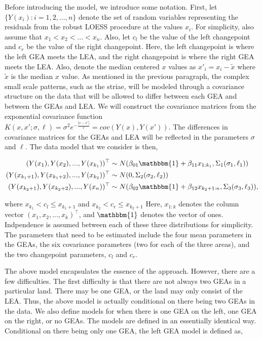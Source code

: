 \documentclass[12pt]{article}
\begin{document}
Before introducing the model, we introduce some notation. First, let
\(\{Y(x_i): i = 1,2, ..., n\}\) denote the set of random variables
representing the residuals from the robust LOESS procedure at the values
\(x_i\). For simplicity, also assume that \(x_1 < x_2 < ... < x_n\).
Also, let \(c_l\) be the value of the left changepoint and \(c_r\) be
the value of the right changepoint. Here, the left changepoint is where
the left GEA meets the LEA, and the right changepoint is where the right
GEA meets the LEA. Also, denote the median centered \(x\) values as
\(x'_i = x_i - \tilde{x}\) where \(\tilde{x}\) is the median \(x\)
value. As mentioned in the previous paragraph, the complex small scale
patterns, such as the striae, will be modeled through a covariance
structure on the data that will be allowed to differ between each GEA
and between the GEAs and LEA. We will construct the covariance matrices
from the exponential covariance function
\(K(x, x';\sigma, \ell) = \sigma^2 e^{-\frac{|x - x'|}{\ell}} = cov(Y(x), Y(x'))\).
The differences in covariance matrices for the GEAs and LEA will be
reflected in the parameters \(\sigma\) and \(\ell\). The data model that
we consider is then,

\begin{align}
(Y(x_1), Y(x_2), ..., Y(x_{k_1}))^{\top} &\sim N(\beta_{01}\mathbbm{1} + \beta_{11} x_{1:k_1}, \Sigma_1(\sigma_1, \ell_1)) \\
(Y(x_{k_1 + 1}), Y(x_{k_1 + 2}), ..., Y(x_{k_2}))^{\top} &\sim N(0, \Sigma_2(\sigma_2, \ell_2)) \\ 
(Y(x_{k_2 + 1}), Y(x_{k_2 + 2}), ..., Y(x_n))^{\top} &\sim N(\beta_{02}\mathbbm{1} + \beta_{12} x_{k_2 + 1:n}, \Sigma_3(\sigma_3, \ell_3)),
\end{align}

\noindent where \(x_{k_1} < c_l \leq x_{k_1 + 1}\) and
\(x_{k_2} < c_r \leq x_{k_2 + 1}\) Here, \(x_{1:k}\) denotes the column
vector \((x_1, x_2, ..., x_k)^\top\), and \(\mathbbm{1}\) denotes the
vector of ones. Indpendence is assumed between each of these three
distributions for simplicity. The parameters that need to be estimated
include the four mean parameters in the GEAs, the six covariance
parameters (two for each of the three areas), and the two changepoint
parameters, \(c_l\) and \(c_r\).

The above model encapsulates the essence of the approach. However, there
are a few difficulties. The first difficulty is that there are not
always two GEAs in a particular land. There may be one GEA, or the land
may only consist of the LEA. Thus, the above model is actually
conditional on there being two GEAs in the data. We also define models
for when there is one GEA on the left, one GEA on the right, or no GEAs.
The models are defined in an essentially identical way. Conditional on
there being only one GEA, the left GEA model is defined as,
\end{document}
